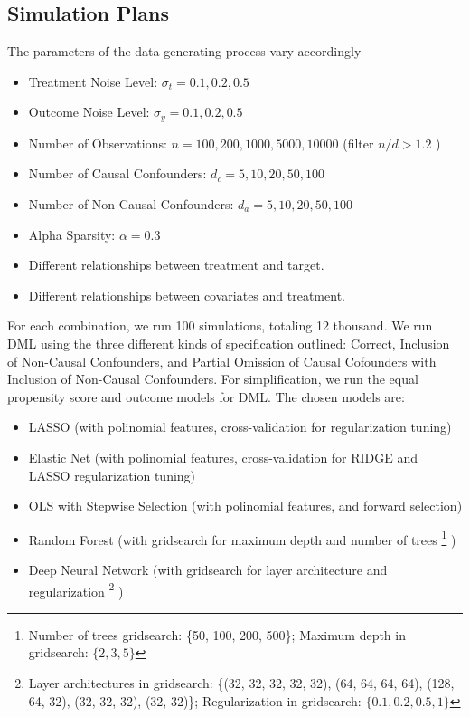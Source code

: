 \documentclass{article}
\numberwithin{equation}{section}
\begin{document}
\subsection{Simulation Plans}

The parameters of the data generating process vary accordingly
\begin{itemize}
    \item Treatment Noise Level: $\sigma_t = 0.1, 0.2, 0.5$
    \item Outcome Noise Level: $\sigma_y = 0.1, 0.2, 0.5$
    \item Number of Observations: $n = 100, 200, 1000, 5000, 10000$ (filter $n / d > 1.2$ )
    \item Number of Causal Confounders: $d_c = 5, 10, 20, 50, 100$
    \item Number of Non-Causal Confounders: $d_a = 5, 10, 20, 50, 100$
    \item Alpha Sparsity: $\alpha = 0.3$
    \item Different relationships between treatment and target.
    \item Different relationships between covariates and treatment.
\end{itemize}

For each combination, we run 100 simulations, totaling 12 thousand. We run DML using the three different kinds of specification outlined: Correct, Inclusion of Non-Causal Confounders, and Partial Omission of Causal Cofounders with Inclusion of Non-Causal Confounders. For simplification, we run the equal propensity score and outcome models for DML. The chosen models are:

\begin{itemize}
    \item LASSO (with polinomial features, cross-validation for regularization tuning)
    \item Elastic Net (with polinomial features, cross-validation for RIDGE and LASSO regularization tuning)
    \item OLS with Stepwise Selection (with polinomial features, and forward selection)
    \item Random Forest (with gridsearch for maximum depth and number of trees
    \footnote{Number of trees gridsearch: \{50, 100, 200, 500\}; Maximum depth in gridsearch: $\{2, 3, 5\}$}
    )
    \item Deep Neural Network (with gridsearch for layer architecture and regularization
    \footnote{Layer architectures in gridsearch: \{(32, 32, 32, 32, 32), (64, 64, 64, 64), (128, 64, 32), (32, 32, 32), (32, 32)\}; Regularization in gridsearch: $\{0.1, 0.2, 0.5, 1\}$}
    )
\end{itemize}
\end{document}
